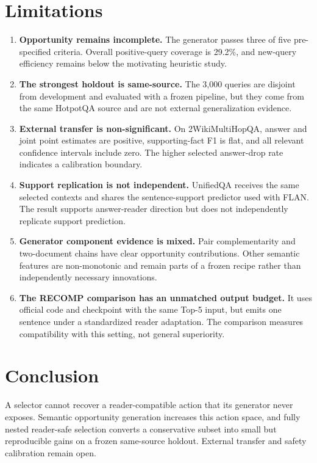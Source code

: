 \documentclass[10pt,twocolumn]{article}
\begin{document}
\section{Limitations}

\begin{enumerate}
\item \textbf{Opportunity remains incomplete.} The generator passes three of five pre-specified criteria. Overall positive-query coverage is 29.2\%, and new-query efficiency remains below the motivating heuristic study.
\item \textbf{The strongest holdout is same-source.} The 3,000 queries are disjoint from development and evaluated with a frozen pipeline, but they come from the same HotpotQA source and are not external generalization evidence.
\item \textbf{External transfer is non-significant.} On 2WikiMultiHopQA, answer and joint point estimates are positive, supporting-fact F1 is flat, and all relevant confidence intervals include zero. The higher selected answer-drop rate indicates a calibration boundary.
\item \textbf{Support replication is not independent.} UnifiedQA receives the same selected contexts and shares the sentence-support predictor used with FLAN. The result supports answer-reader direction but does not independently replicate support prediction.
\item \textbf{Generator component evidence is mixed.} Pair complementarity and two-document chains have clear opportunity contributions. Other semantic features are non-monotonic and remain parts of a frozen recipe rather than independently necessary innovations.
\item \textbf{The RECOMP comparison has an unmatched output budget.} It uses official code and checkpoint with the same Top-5 input, but emits one sentence under a standardized reader adaptation. The comparison measures compatibility with this setting, not general superiority.
\end{enumerate}

\section{Conclusion}

A selector cannot recover a reader-compatible action that its generator never exposes. Semantic opportunity generation increases this action space, and fully nested reader-safe selection converts a conservative subset into small but reproducible gains on a frozen same-source holdout. External transfer and safety calibration remain open.
\end{document}
